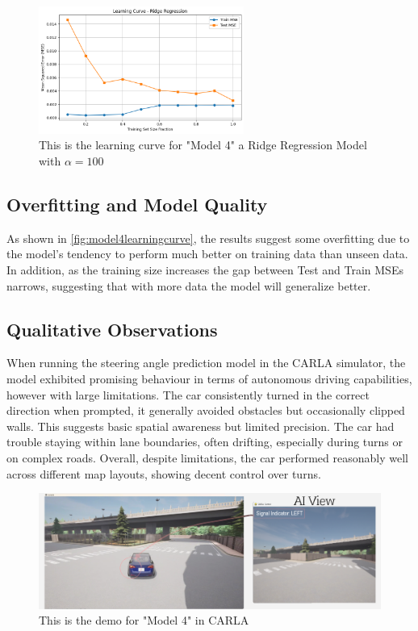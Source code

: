 \documentclass{article} %
\begin{document}
\begin{figure}[H] %
    \centering
    \includegraphics[width=0.6\textwidth]{model4learningcurve.png} %
    \caption{This is the learning curve for "Model 4" a Ridge Regression Model with $\alpha = 100$}
    \label{fig:model4learningcurve}
\end{figure}

\subsection{Overfitting and Model Quality}
As shown in \autoref{fig:model4learningcurve}, the results suggest some overfitting due to the model's tendency
to perform much better on training data than unseen data. In addition, as the training size
increases the gap between Test and Train MSEs narrows, suggesting that with more data the model will generalize better.


\subsection{Qualitative Observations}
When running the steering angle prediction model in the CARLA simulator, the model exhibited promising behaviour in terms of
autonomous driving capabilities, however with large limitations. The car consistently turned in the correct direction when prompted,
it generally avoided obstacles but occasionally clipped walls. This suggests basic spatial awareness but limited precision. The car had trouble staying within lane boundaries,
often drifting, especially during turns or on complex roads. Overall, despite limitations, the car performed reasonably well across different map layouts, showing decent control over turns.


\begin{figure}[H] %
    \centering
    \includegraphics[width=1.0\textwidth]{model4demo.png} %
    \caption{This is the demo for "Model 4" in CARLA}
    \label{fig:model4demo}
\end{figure}
\end{document}
